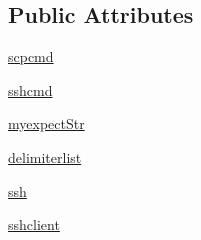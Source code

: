 \subsection*{\-Public \-Attributes}
\begin{DoxyCompactItemize}
\item 
\hyperlink{classcyberweb_1_1lib_1_1jodis_1_1sshresource_1_1gsissh_a9c99a600335902e0b67c322897b5281b}{scpcmd}
\item 
\hyperlink{classcyberweb_1_1lib_1_1jodis_1_1sshresource_1_1gsissh_a5310fb9213a8cbffbdc06890c7a91e29}{sshcmd}
\item 
\hyperlink{classcyberweb_1_1lib_1_1jodis_1_1sshresource_1_1gsissh_a4d9caacab4d281106a43c4190c87bc8f}{myexpect\-Str}
\item 
\hyperlink{classcyberweb_1_1lib_1_1jodis_1_1sshresource_1_1gsissh_ae085a3d32ae9ea1ce5457c12c32fb016}{delimiterlist}
\item 
\hyperlink{classcyberweb_1_1lib_1_1jodis_1_1sshresource_1_1gsissh_ae1881b358c8a606a030aad5c0685c159}{ssh}
\item 
\hyperlink{classcyberweb_1_1lib_1_1jodis_1_1sshresource_1_1gsissh_aaa9697ecba88fb3d2882cf351bfb9c6c}{sshclient}
\end{DoxyCompactItemize}


